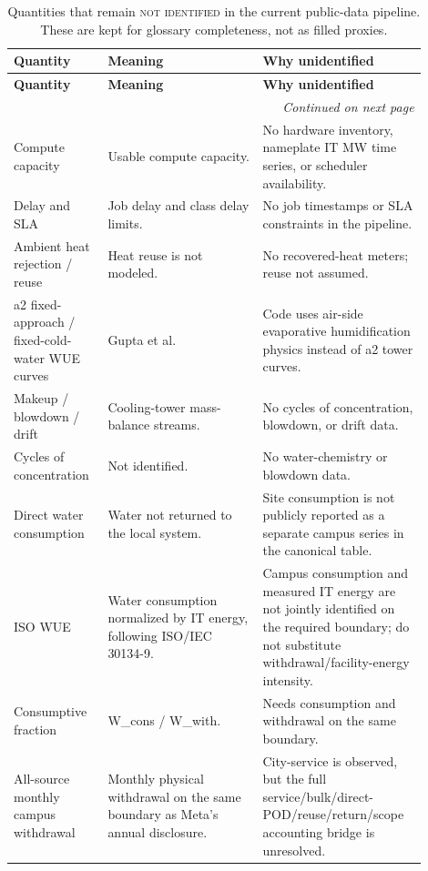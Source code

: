 \documentclass[11pt]{article}
\newcommand{\newtxt}[1]{\textcolor{green!45!black}{#1}}
\newcommand{\latesttxt}[1]{\textcolor{purple!85!black}{#1}}
\newcommand{\NotIdentified}{\textsc{not identified}}
\begin{document}
\begingroup
\footnotesize
\setlength{\tabcolsep}{3.5pt}
\begin{longtable}{@{}p{0.20\linewidth}p{0.35\linewidth}p{0.35\linewidth}@{}}
\caption{Quantities that remain \NotIdentified{} in the current public-data pipeline. These are kept for glossary completeness, not as filled proxies.}\\
\toprule
\textbf{Quantity} & \textbf{Meaning} & \textbf{Why unidentified} \\
\midrule
\endfirsthead
\toprule
\textbf{Quantity} & \textbf{Meaning} & \textbf{Why unidentified} \\
\midrule
\endhead
\midrule
\multicolumn{3}{r}{\emph{Continued on next page}}\\
\endfoot
\bottomrule
\endlastfoot
Compute capacity & Usable compute capacity. & No hardware inventory, nameplate IT MW time series, or scheduler availability.\\
Delay and SLA & Job delay and class delay limits. & No job timestamps or SLA constraints in the pipeline.\\
Ambient heat rejection / reuse & Heat reuse is not modeled. & No recovered-heat meters; reuse not assumed.\\
a2 fixed-approach / fixed-cold-water WUE curves & Gupta et al. & Code uses air-side evaporative humidification physics instead of a2 tower curves.\\
Makeup / blowdown / drift & Cooling-tower mass-balance streams. & No cycles of concentration, blowdown, or drift data.\\
Cycles of concentration & Not identified. & No water-chemistry or blowdown data.\\
Direct water consumption & Water not returned to the local system. & Site consumption is not publicly reported as a separate campus series in the canonical table.\\
\newtxt{ISO WUE} & \newtxt{Water consumption normalized by IT energy, following ISO/IEC 30134-9.} & \newtxt{Campus consumption and measured IT energy are not jointly identified on the required boundary; do not substitute withdrawal/facility-energy intensity.}\\
Consumptive fraction & W\_cons / W\_with. & Needs consumption and withdrawal on the same boundary.\\
\latesttxt{All-source monthly campus withdrawal} & \latesttxt{Monthly physical withdrawal on the same boundary as Meta's annual disclosure.} & \latesttxt{City-service is observed, but the full service/bulk/direct-POD/reuse/return/scope accounting bridge is unresolved.}\\

\end{longtable}
\end{document}
